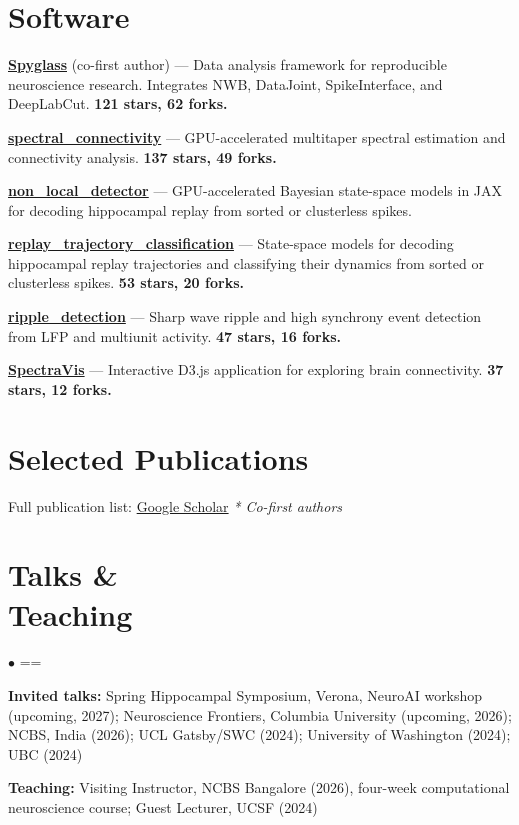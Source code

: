 \documentclass[margin,line]{res}
\makeatletter
\newenvironment{list2}{
  \begin{list}{$\bullet$}{%
      \@beginparpenalty=\@M \@itempenalty=\@M
      \setlength{\itemsep}{0in}
      \setlength{\parsep}{0in} \setlength{\parskip}{0in}
      \setlength{\topsep}{0in} \setlength{\partopsep}{0in} 
      \setlength{\leftmargin}{0.2in}}}{\end{list}}
\makeatother
\begin{document}
\begin{resume}
\section{Software}

\href{https://github.com/LorenFrankLab/spyglass}{\textbf{Spyglass}} (co-first author) — Data analysis framework for reproducible neuroscience research. Integrates NWB, DataJoint, SpikeInterface, and DeepLabCut. \textbf{121 stars, 62 forks.}

\href{https://github.com/Eden-Kramer-Lab/spectral_connectivity}{\textbf{spectral\_connectivity}} — GPU-accelerated multitaper spectral estimation and connectivity analysis. \textbf{137 stars, 49 forks.}

\href{https://github.com/LorenFrankLab/non_local_detector}{\textbf{non\_local\_detector}} — GPU-accelerated Bayesian state-space models in JAX for decoding hippocampal replay from sorted or clusterless spikes.

\href{https://github.com/Eden-Kramer-Lab/replay_trajectory_classification}{\textbf{replay\_trajectory\_classification}} — State-space models for decoding hippocampal replay trajectories and classifying their dynamics from sorted or clusterless spikes. \textbf{53 stars, 20 forks.}

\href{https://github.com/Eden-Kramer-Lab/ripple_detection}{\textbf{ripple\_detection}} — Sharp wave ripple and high synchrony event detection from LFP and multiunit activity. \textbf{47 stars, 16 forks.}

\href{https://github.com/NeurophysVis/SpectraVis}{\textbf{SpectraVis}} — Interactive D3.js application for exploring brain connectivity. \textbf{37 stars, 12 forks.}

\section{Selected Publications}
Full publication list: \href{https://scholar.google.com/citations?user=vuENbkoAAAAJ}{Google Scholar} \hfill \emph{* Co-first authors}
\vspace{.1in}

\nocite{lee2026spyglass,chu2025realtimedecoder,coulter2025closedloop,joshi2023stepping,denovellis2022spectral,denovellis2021replay,buschman2012synchronous}
\printbibliography[heading=none,env=cvbib]

\section{Talks \&\\ Teaching}
\begin{list2}
\item \textbf{Invited talks:} Spring Hippocampal Symposium, Verona, NeuroAI workshop (upcoming, 2027); Neuroscience Frontiers, Columbia University (upcoming, 2026); NCBS, India (2026); UCL Gatsby/SWC (2024); University of Washington (2024); UBC (2024)
\item \textbf{Teaching:} Visiting Instructor, NCBS Bangalore (2026), four-week computational neuroscience course; Guest Lecturer, UCSF (2024)
\end{list2}


\end{resume}
\end{document}
